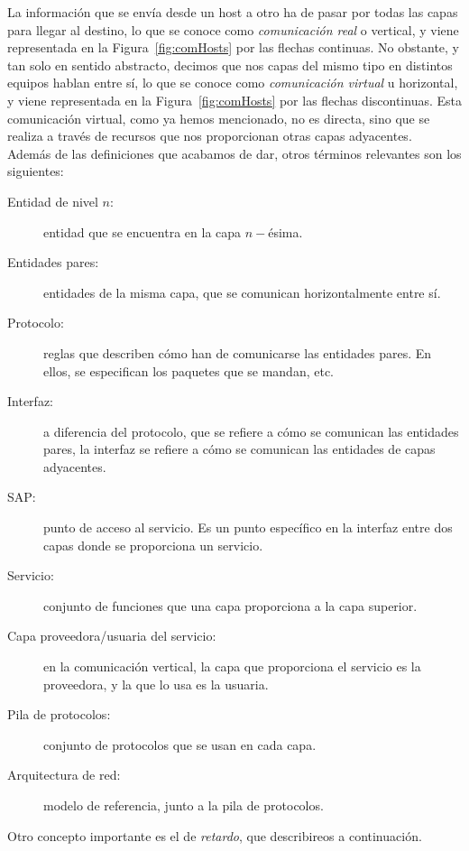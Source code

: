 La información que se envía desde un host a otro ha de pasar por todas las capas para llegar al destino, lo que se conoce como \emph{comunicación real} o vertical, y viene representada en la Figura~\ref{fig:comHosts} por las flechas continuas. No obstante, y tan solo en sentido abstracto, decimos que nos capas del mismo tipo en distintos equipos hablan entre sí, lo que se conoce como \emph{comunicación virtual} u horizontal, y viene representada en la Figura~\ref{fig:comHosts} por las flechas discontinuas. Esta comunicación virtual, como ya hemos mencionado, no es directa, sino que se realiza a través de recursos que nos proporcionan otras capas adyacentes.\\

Además de las definiciones que acabamos de dar, otros términos relevantes son los siguientes:
\begin{description}
    \item [Entidad de nivel $n$:] entidad que se encuentra en la capa $n-$ésima.
    \item [Entidades pares:] entidades de la misma capa, que se comunican horizontalmente entre sí.
    \item [Protocolo:] reglas que describen cómo han de comunicarse las entidades pares. En ellos, se especifican los paquetes que se mandan, etc.
    \item [Interfaz:] a diferencia del protocolo, que se refiere a cómo se comunican las entidades pares, la interfaz se refiere a cómo se comunican las entidades de capas adyacentes.
    \item [\acrfull{SAP}:] punto de acceso al servicio. Es un punto específico en la interfaz entre dos capas donde se proporciona un servicio.
    \item [Servicio:] conjunto de funciones que una capa proporciona a la capa superior.
    \item [Capa proveedora/usuaria del servicio:] en la comunicación vertical, la capa que proporciona el servicio es la proveedora, y la que lo usa es la usuaria.
    \item [Pila de protocolos:] conjunto de protocolos que se usan en cada capa.
    \item [Arquitectura de red:] modelo de referencia, junto a la pila de protocolos.
\end{description}





Otro concepto importante es el de \emph{retardo}, que describireos a continuación.
